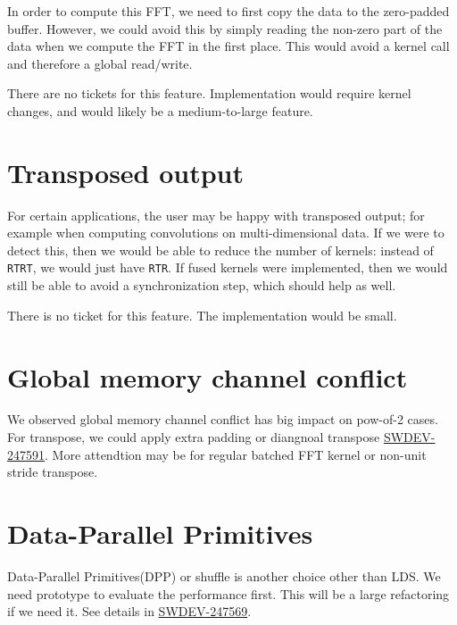 \documentclass[12pt]{article}
\renewcommand{\(}{\left(}
\renewcommand{\)}{\right)}
\begin{document}
In order to compute this FFT, we need to first copy the data to the
zero-padded buffer.  However, we could avoid this by simply reading
the non-zero part of the data when we compute the FFT in the first
place.  This would avoid a kernel call and therefore a global
read/write.

There are no tickets for this feature.  Implementation would require
kernel changes, and would likely be a medium-to-large feature.

\section{Transposed output}

For certain applications, the user may be happy with transposed
output; for example when computing convolutions on multi-dimensional
data.  If we were to detect this, then we would be able to reduce the
number of kernels: instead of \texttt{RTRT}, we would just have
\texttt{RTR}.  If fused kernels were implemented, then we would still
be able to avoid a synchronization step, which should help as well.

There is no ticket for this feature.  The implementation would be
small.

\section{Global memory channel conflict}

We observed global memory channel conflict has big impact on pow-of-2
cases. For transpose, we could apply extra padding or diangnoal 
transpose \href{http://ontrack-internal.amd.com/browse/SWDEV-247591}
{SWDEV-247591}. More attendtion may be for regular batched FFT kernel
or non-unit stride transpose.


\section{Data-Parallel Primitives}
Data-Parallel Primitives(DPP) or shuffle is another choice other than
LDS. We need prototype to evaluate the performance first. This will be
a large refactoring if we need it. See details in 
\href{http://ontrack-internal.amd.com/browse/SWDEV-247569}
{SWDEV-247569}.
\end{document}
